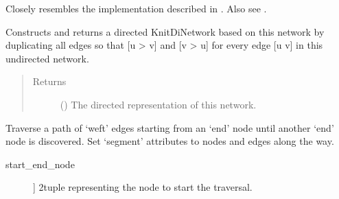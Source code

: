 \documentclass[letterpaper,10pt,english]{sphinxmanual}
\begin{document}
\begin{fulllineitems}
\begin{fulllineitems}
Closely resembles the implementation described in  \sphinxfootnotemark[1]. Also see
 \sphinxfootnotemark[2].

\end{fulllineitems}


\begin{fulllineitems}
\label{\detokenize{cockatoo:cockatoo.KnitNetwork.to_KnitDiNetwork}}
Constructs and returns a directed KnitDiNetwork based on this network
by duplicating all edges so that {[}u \sphinxhyphen{}\textgreater{} v{]} and {[}v \sphinxhyphen{}\textgreater{} u{]} for every
edge {[}u \sphinxhyphen{} v{]} in this undirected network.
\begin{quote}\begin{description}
\item[{Returns}] \leavevmode
{} ({\hyperref[\detokenize{cockatoo:cockatoo.KnitDiNetwork}]{}}) \textendash{} The directed representation of this network.

\end{description}\end{quote}

\end{fulllineitems}


\begin{fulllineitems}
\label{\detokenize{cockatoo:cockatoo.KnitNetwork.traverse_weft_edges_and_set_attributes}}
Traverse a path of ‘weft’ edges starting from an ‘end’ node until
another ‘end’ node is discovered. Set ‘segment’ attributes to nodes
and edges along the way.
\begin{description}
\item[{start\_end\_node}] \leavevmode{[}%
\begin{footnote}[140]\sphinxAtStartFootnote
{}
%
\end{footnote}{]}
2\sphinxhyphen{}tuple representing the node to start the traversal.


\end{description}
\end{fulllineitems}
\end{fulllineitems}
\end{document}
